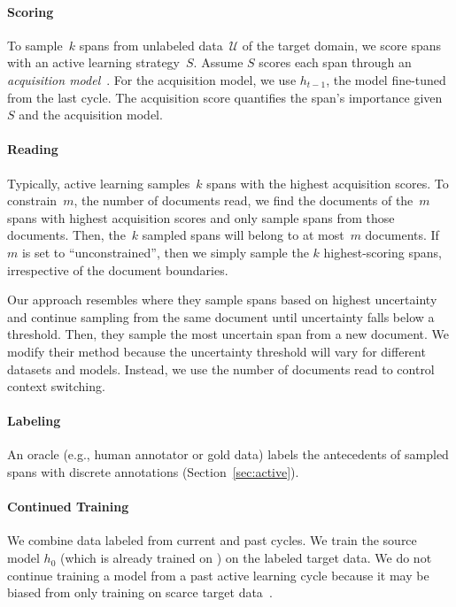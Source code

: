 \paragraph{Scoring}
To sample~$k$ spans from unlabeled
data~$\mathcal{U}$ of the target domain, we score spans with an
active learning strategy~$S$.
Assume $S$
scores each span through an \textit{acquisition model}~\citep{lowell-2019}.
For the acquisition model, we use $h_{t-1}$, the model fine-tuned from the last cycle.
The acquisition score quantifies the span's importance given
$S$ and the acquisition model.

\paragraph{Reading}
Typically, active learning samples~$k$ spans with
the highest acquisition scores.
To constrain~$m$, the number of documents read, we
find the documents of the~$m$ spans with highest
acquisition scores and only sample spans from those documents.
Then, the~$k$ sampled spans will belong to at most~$m$ documents.
If $m$ is set to ``unconstrained'', then we simply sample the $k$
highest-scoring spans,
irrespective of the document boundaries.

Our approach resembles \citet{miller-2012} where they sample spans based on
highest uncertainty and continue sampling from the same document until
uncertainty falls below a threshold.
Then, they sample the most uncertain span
from a new document. We modify their method because the uncertainty
threshold will vary for different
datasets and models.  Instead, we use the number of documents read to
control context switching.

\paragraph{Labeling}
An oracle (e.g.,
human annotator or gold data) labels the antecedents of sampled spans with discrete
annotations (Section~\ref{sec:active}).

\paragraph{Continued Training}
We combine data labeled from current and past cycles. We
train the source model $h_0$ (which is already trained on \ontonotes{}) on the labeled target data. We do not continue training a model from a past active learning cycle because
it may be biased from only training on scarce target
data~\citep{ash-2020-warmstart}.


